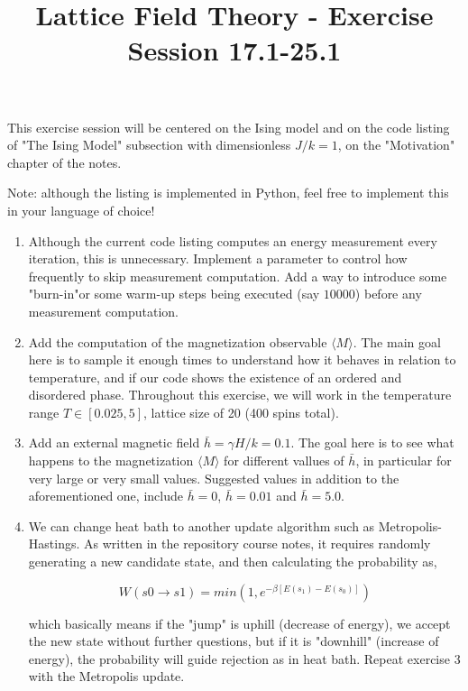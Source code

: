\documentclass{article}
\title{Lattice Field Theory - Exercise Session 17.1-25.1}
\begin{document}
\maketitle

This exercise session will be centered on the Ising model and on the code listing of "The Ising Model" subsection with dimensionless $J/k=1$, on the "Motivation" chapter of the notes. 

Note: although the listing is implemented in Python, feel free to implement this in your language of choice!

\begin{enumerate}

\item Although the current code listing computes an energy measurement every iteration, this is unnecessary. Implement a parameter to control how frequently to skip measurement computation. Add a way to introduce some "burn-in"or some warm-up steps being executed (say $10000$) before any measurement computation.

\item Add the computation of the magnetization observable $\langle M \rangle$. The main goal here is to sample it enough times to understand how it behaves in relation to temperature, and if our code shows the existence of an ordered and disordered phase. Throughout this exercise, we will work in the temperature range $T \in [0.025,5]$, lattice size of 20 (400 spins total).

\item Add an external magnetic field $\bar{h} = \gamma H / k = 0.1$. The goal here is to see what happens to the magnetization $\langle M \rangle$ for different vallues of $\bar{h}$, in particular for very large or very small values. Suggested values in addition to the aforementioned one, include $\bar{h}=0$, $\bar{h}=0.01$ and $\bar{h}=5.0$. 

\item We can change heat bath to another update algorithm such as Metropolis-Hastings. As written in the repository course notes, it requires randomly generating a new candidate state, and then calculating the probability as,

\begin{equation}
W(s0 \rightarrow s1) = min(1, e^{-\beta [E(s_1)-E(s_0)] } )
\end{equation}

which basically means if the "jump" is uphill (decrease of energy), we accept the new state without further questions, but if it is "downhill" (increase of energy), the probability will guide rejection as in heat bath. Repeat exercise 3 with the Metropolis update.

\end{enumerate}
\end{document}
